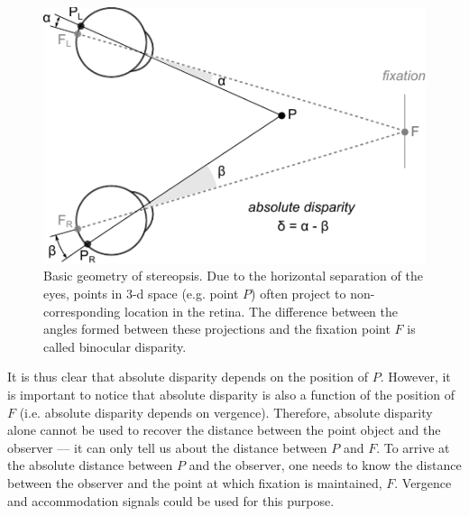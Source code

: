 \begin{figure}
  \centering
  \includegraphics{absolute-disparity}
  \caption[Basic geometry of stereopsis.]{Basic geometry of stereopsis. Due to the horizontal separation of the eyes, points in 3-d space (e.g. point $P$) often project to non-corresponding location in the retina. The difference between the angles formed between these projections and the fixation point $F$ is called binocular disparity.}
  \label{fig:geostereo}
\end{figure}

It is thus clear that absolute disparity depends on the position of $P$. However, it is important to notice that absolute disparity is also a function of the position of $F$ (i.e.  absolute disparity depends on vergence). Therefore, absolute disparity alone cannot be used to recover the distance between the point object and the observer --- it can only tell us about the distance between $P$ and $F$. To arrive at the absolute distance between $P$ and the observer, one needs to know the distance between the observer and the point at which fixation is maintained, $F$. Vergence and accommodation signals could be used for this purpose.

